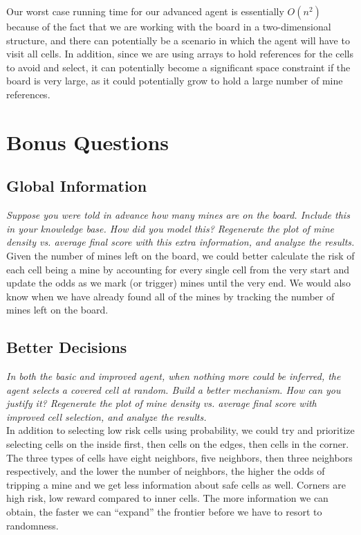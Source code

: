 \documentclass[11pt]{article} %
\begin{document}
Our worst case running time for our advanced agent is essentially $O(n^2)$ because of the fact that we are working with the board in a two-dimensional structure, and there can potentially be a scenario in which the agent will have to visit all cells. In addition, since we are using arrays to hold references for the cells to avoid and select, it can potentially become a significant space constraint if the board is very large, as it could potentially grow to hold a large number of mine references.\\

\section{\textbf{Bonus Questions}}

\subsection{Global Information}

\textit{Suppose you were told in advance how many mines are on the board. Include this in your knowledge base. How did you model this? Regenerate the plot of mine density vs. average final score with this extra information, and analyze the results.}\\

Given the number of mines left on the board, we could better calculate the risk of each cell being a mine by accounting for every single cell from the very start and update the odds as we mark (or trigger) mines until the very end. We would also know when we have already found all of the mines by tracking the number of mines left on the board.

\subsection{Better Decisions}

\textit{In both the basic and improved agent, when nothing more could be inferred, the agent selects a covered cell at random. Build a better mechanism. How can you justify it? Regenerate the plot of mine density vs. average final score with improved cell selection, and analyze the results.}\\

In addition to selecting low risk cells using probability, we could try and prioritize selecting cells on the inside first, then cells on the edges, then cells in the corner. The three types of cells have eight neighbors, five neighbors, then three neighbors respectively, and the lower the number of neighbors, the higher the odds of tripping a mine and we get less information about safe cells as well. Corners are high risk, low reward compared to inner cells. The more information we can obtain, the faster we can “expand” the frontier before we have to resort to randomness.
\end{document}
